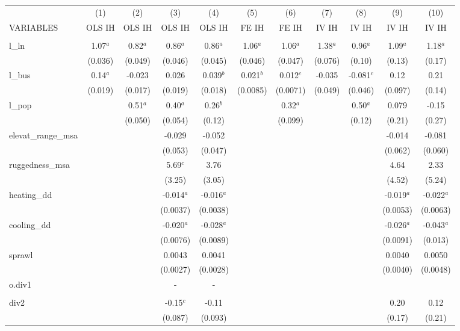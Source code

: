 \documentclass[]{article}
\begin{document}
\begin{tabular}{lcccccccccc} \hline
 & (1) & (2) & (3) & (4) & (5) & (6) & (7) & (8) & (9) & (10) \\
VARIABLES & OLS IH & OLS IH & OLS IH & OLS IH & FE IH & FE IH & IV IH & IV IH & IV IH & IV IH \\ \hline
 &  &  &  &  &  &  &  &  &  &  \\
l\_ln & 1.07$^a$ & 0.82$^a$ & 0.86$^a$ & 0.86$^a$ & 1.06$^a$ & 1.06$^a$ & 1.38$^a$ & 0.96$^a$ & 1.09$^a$ & 1.18$^a$ \\
 & (0.036) & (0.049) & (0.046) & (0.045) & (0.046) & (0.047) & (0.076) & (0.10) & (0.13) & (0.17) \\
l\_bus & 0.14$^a$ & -0.023 & 0.026 & 0.039$^b$ & 0.021$^b$ & 0.012$^c$ & -0.035 & -0.081$^c$ & 0.12 & 0.21 \\
 & (0.019) & (0.017) & (0.019) & (0.018) & (0.0085) & (0.0071) & (0.049) & (0.046) & (0.097) & (0.14) \\
l\_pop &  & 0.51$^a$ & 0.40$^a$ & 0.26$^b$ &  & 0.32$^a$ &  & 0.50$^a$ & 0.079 & -0.15 \\
 &  & (0.050) & (0.054) & (0.12) &  & (0.099) &  & (0.12) & (0.21) & (0.27) \\
elevat\_range\_msa &  &  & -0.029 & -0.052 &  &  &  &  & -0.014 & -0.081 \\
 &  &  & (0.053) & (0.047) &  &  &  &  & (0.062) & (0.060) \\
ruggedness\_msa &  &  & 5.69$^c$ & 3.76 &  &  &  &  & 4.64 & 2.33 \\
 &  &  & (3.25) & (3.05) &  &  &  &  & (4.52) & (5.24) \\
heating\_dd &  &  & -0.014$^a$ & -0.016$^a$ &  &  &  &  & -0.019$^a$ & -0.022$^a$ \\
 &  &  & (0.0037) & (0.0038) &  &  &  &  & (0.0053) & (0.0063) \\
cooling\_dd &  &  & -0.020$^a$ & -0.028$^a$ &  &  &  &  & -0.026$^a$ & -0.043$^a$ \\
 &  &  & (0.0076) & (0.0089) &  &  &  &  & (0.0091) & (0.013) \\
sprawl &  &  & 0.0043 & 0.0041 &  &  &  &  & 0.0040 & 0.0050 \\
 &  &  & (0.0027) & (0.0028) &  &  &  &  & (0.0040) & (0.0048) \\
o.div1 &  &  & - & - &  &  &  &  &  &  \\
 &  &  &  &  &  &  &  &  &  &  \\
div2 &  &  & -0.15$^c$ & -0.11 &  &  &  &  & 0.20 & 0.12 \\
 &  &  & (0.087) & (0.093) &  &  &  &  & (0.17) & (0.21) \\

\end{tabular}
\end{document}
